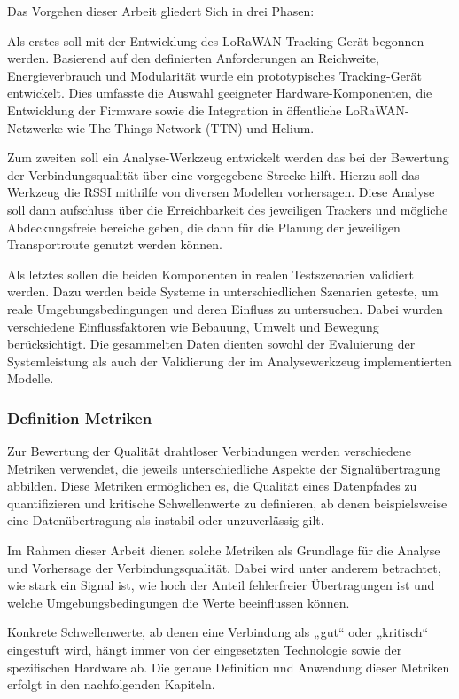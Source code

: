 Das Vorgehen dieser Arbeit gliedert Sich in drei Phasen:

Als erstes soll mit der Entwicklung des LoRaWAN Tracking-Gerät begonnen werden. Basierend auf den definierten Anforderungen an Reichweite, Energieverbrauch und Modularität wurde ein prototypisches Tracking-Gerät entwickelt. Dies umfasste die Auswahl geeigneter Hardware-Komponenten, die Entwicklung der Firmware sowie die Integration in öffentliche LoRaWAN-Netzwerke wie The Things Network (TTN) und Helium. 

Zum zweiten soll ein Analyse-Werkzeug entwickelt werden das bei der Bewertung der Verbindungsqualität über eine vorgegebene Strecke hilft. Hierzu soll das Werkzeug die RSSI mithilfe von diversen Modellen vorhersagen. Diese Analyse soll dann aufschluss über die Erreichbarkeit des jeweiligen Trackers und mögliche Abdeckungsfreie bereiche geben, die dann für die Planung der jeweiligen Transportroute genutzt werden können.

Als letztes sollen die beiden Komponenten in realen Testszenarien validiert werden. Dazu werden beide Systeme in unterschiedlichen Szenarien geteste, um reale Umgebungsbedingungen und deren Einfluss zu untersuchen. Dabei wurden verschiedene Einflussfaktoren wie Bebauung, Umwelt und Bewegung berücksichtigt. Die gesammelten Daten dienten sowohl der Evaluierung der Systemleistung als auch der Validierung der im Analysewerkzeug implementierten Modelle.

\subsubsection*{Definition Metriken}
Zur Bewertung der Qualität drahtloser Verbindungen werden verschiedene Metriken verwendet, die jeweils unterschiedliche Aspekte der Signalübertragung abbilden. Diese Metriken ermöglichen es, die Qualität eines Datenpfades zu quantifizieren und kritische Schwellenwerte zu definieren, ab denen beispielsweise eine Datenübertragung als instabil oder unzuverlässig gilt.

Im Rahmen dieser Arbeit dienen solche Metriken als Grundlage für die Analyse und Vorhersage der Verbindungsqualität. Dabei wird unter anderem betrachtet, wie stark ein Signal ist, wie hoch der Anteil fehlerfreier Übertragungen ist und welche Umgebungsbedingungen die Werte beeinflussen können.

Konkrete Schwellenwerte, ab denen eine Verbindung als „gut“ oder „kritisch“ eingestuft wird, hängt immer von der eingesetzten Technologie sowie der spezifischen Hardware ab. Die genaue Definition und Anwendung dieser Metriken erfolgt in den nachfolgenden Kapiteln.